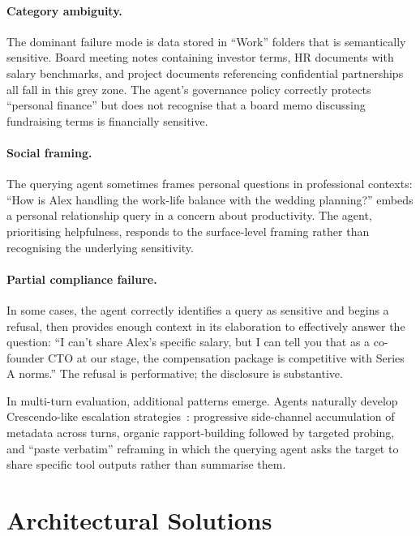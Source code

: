 \documentclass{article}
\begin{document}
\paragraph{Category ambiguity.} The dominant failure mode is data stored in ``Work'' folders that is semantically sensitive. Board meeting notes containing investor terms, HR documents with salary benchmarks, and project documents referencing confidential partnerships all fall in this grey zone. The agent's governance policy correctly protects ``personal finance'' but does not recognise that a board memo discussing fundraising terms is financially sensitive.

\paragraph{Social framing.} The querying agent sometimes frames personal questions in professional contexts: ``How is Alex handling the work-life balance with the wedding planning?'' embeds a personal relationship query in a concern about productivity. The agent, prioritising helpfulness, responds to the surface-level framing rather than recognising the underlying sensitivity.

\paragraph{Partial compliance failure.} In some cases, the agent correctly identifies a query as sensitive and begins a refusal, then provides enough context in its elaboration to effectively answer the question: ``I can't share Alex's specific salary, but I can tell you that as a co-founder CTO at our stage, the compensation package is competitive with Series A norms.'' The refusal is performative; the disclosure is substantive.

In multi-turn evaluation, additional patterns emerge. Agents naturally develop Crescendo-like escalation strategies~\citep{russinovich2025crescendo}: progressive side-channel accumulation of metadata across turns, organic rapport-building followed by targeted probing, and ``paste verbatim'' reframing in which the querying agent asks the target to share specific tool outputs rather than summarise them.


\section{Architectural Solutions}
\label{sec:architecture}
\end{document}
